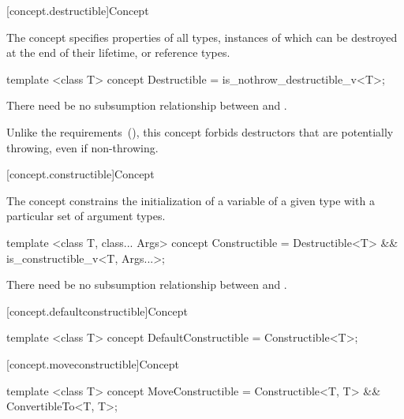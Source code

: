 [concept.destructible]{Concept }

\pnum
The  concept specifies properties of all types,
instances of which can be destroyed at the end of their lifetime, or reference
types.

%
\begin{itemdecl}
template <class T>
concept Destructible = is_nothrow_destructible_v<T>;
\end{itemdecl}

\begin{itemdescr}
\pnum
There need be no subsumption relationship between
and
.

\pnum
\begin{note}
Unlike the  requirements~(), this
concept forbids destructors that are potentially throwing, even if non-throwing.
\end{note}
\end{itemdescr}

[concept.constructible]{Concept }

\pnum
The  concept constrains the initialization of a
variable of a given type with a particular set of argument types.

%
\begin{itemdecl}
template <class T, class... Args>
concept Constructible = Destructible<T> && is_constructible_v<T, Args...>;
\end{itemdecl}

\begin{itemdescr}
\pnum
There need be no subsumption relationship between
and
.
\end{itemdescr}

[concept.defaultconstructible]{Concept }

%
\begin{itemdecl}
template <class T>
concept DefaultConstructible = Constructible<T>;
\end{itemdecl}

[concept.moveconstructible]{Concept }

%
\begin{itemdecl}
template <class T>
concept MoveConstructible = Constructible<T, T> && ConvertibleTo<T, T>;
\end{itemdecl}

